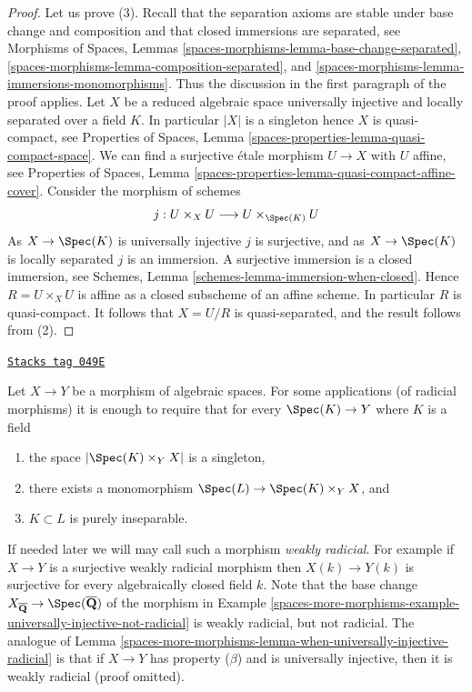 \begin{proof}
\medskip\noindent
Let us prove (3).
Recall that the separation axioms are stable under base change
and composition and that closed immersions are separated, see
Morphisms of Spaces,
Lemmas \ref{spaces-morphisms-lemma-base-change-separated},
\ref{spaces-morphisms-lemma-composition-separated}, and
\ref{spaces-morphisms-lemma-immersions-monomorphisms}.
Thus the discussion in the first paragraph of the proof applies.
Let $X$ be a reduced algebraic space universally injective and
locally separated over a field $K$.
In particular $|X|$ is a singleton hence $X$ is quasi-compact, see
Properties of Spaces, Lemma \ref{spaces-properties-lemma-quasi-compact-space}.
We can find a surjective \'etale morphism $U \to X$ with $U$ affine, see
Properties of Spaces,
Lemma \ref{spaces-properties-lemma-quasi-compact-affine-cover}.
Consider the morphism of schemes
$$
j :
U \times_X U
\longrightarrow
U \times_{\Spec(K)} U
$$
As $X \to \Spec(K)$ is universally injective $j$ is surjective,
and as $X \to \Spec(K)$ is locally separated $j$ is an immersion.
A surjective immersion is a closed immersion, see
Schemes, Lemma \ref{schemes-lemma-immersion-when-closed}.
Hence $R = U \times_X U$ is affine as a closed subscheme of an affine scheme.
In particular $R$ is quasi-compact.
It follows that $X = U/R$ is quasi-separated, and the result follows from (2).
\end{proof}

\begin{remark}
\label{spaces-more-morphisms-remark-weakly-radicial}
\href{https://stacks.math.columbia.edu/tag/049E}{\texttt{Stacks tag 049E}}

Let $X \to Y$ be a morphism of algebraic spaces.
For some applications (of radicial morphisms)
it is enough to require that for every
$\Spec(K) \to Y$ where $K$ is a field
\begin{enumerate}
\item the space $|\Spec(K) \times_Y X|$ is a singleton,
\item there exists a monomorphism
$\Spec(L) \to \Spec(K) \times_Y X$, and
\item $K \subset L$ is purely inseparable.
\end{enumerate}
If needed later we will may call such a morphism {\it weakly radicial}.
For example if $X \to Y$ is a surjective weakly radicial morphism
then $X(k) \to Y(k)$ is surjective for every algebraically closed field $k$.
Note that the base change
$X_{\overline{\mathbf{Q}}} \to \Spec(\overline{\mathbf{Q}})$
of the morphism in
Example \ref{spaces-more-morphisms-example-universally-injective-not-radicial}
is weakly radicial, but not radicial. The analogue of
Lemma \ref{spaces-more-morphisms-lemma-when-universally-injective-radicial}
is that if $X \to Y$ has property ($\beta$) and is universally
injective, then it is weakly radicial (proof omitted).
\end{remark}

